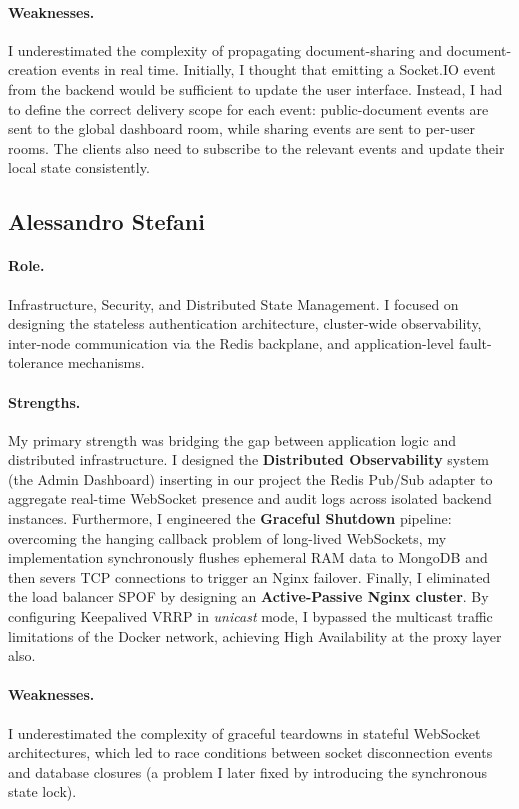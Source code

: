 \documentclass{scrartcl}
\begin{document}
  \paragraph{Weaknesses.}
  I underestimated the complexity of propagating document-sharing and document-creation
  events in real time. Initially, I thought that emitting a Socket.IO event from the
  backend would be sufficient to update the user interface. Instead, I had to define the
  correct delivery scope for each event: public-document events are sent to the global
  dashboard room, while sharing events are sent to per-user rooms. The clients also need
  to subscribe to the relevant events and update their local state consistently.

  \subsection{Alessandro Stefani}

  \paragraph{Role.}
  Infrastructure, Security, and Distributed State Management.
  I focused on designing the stateless authentication architecture, cluster-wide observability,
  inter-node communication via the Redis backplane, and application-level fault-tolerance mechanisms.

  \paragraph{Strengths.}
  My primary strength was bridging the gap between application logic and distributed infrastructure.
  I designed the \textbf{Distributed Observability} system (the Admin Dashboard) inserting in our project the Redis Pub/Sub adapter
  to aggregate real-time WebSocket presence and audit logs across isolated backend instances.
  Furthermore, I engineered the \textbf{Graceful Shutdown} pipeline: overcoming the hanging callback problem
  of long-lived WebSockets, my implementation synchronously flushes ephemeral RAM data to MongoDB
  and then severs TCP connections to trigger an Nginx failover.
  Finally, I eliminated the load balancer SPOF by designing an \textbf{Active-Passive Nginx cluster}.
  By configuring Keepalived VRRP in \emph{unicast} mode, I bypassed the multicast traffic limitations of the Docker network,
  achieving High Availability at the proxy layer also.

  \paragraph{Weaknesses.}
  I underestimated the complexity of graceful teardowns in stateful WebSocket architectures,
  which led to race conditions between socket disconnection events and database closures
  (a problem I later fixed by introducing the synchronous state lock).
\end{document}
